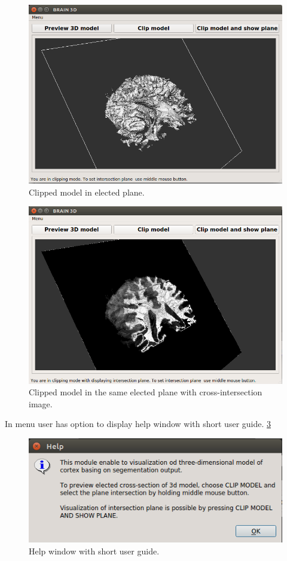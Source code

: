 \begin{figure}[H]
\centering{}\includegraphics[scale=0.7]{figures/Module_11/11_test_7.png}\caption{Clipped model in elected plane. \label{fig:figures/11_test_7}}
\end{figure}
\begin{figure}[H]
\centering{}\includegraphics[scale=0.7]{figures/Module_11/11_test_8.png}\caption{Clipped model in the same elected plane with cross-intersection image. \label{fig:figures/11_test_8}}
\end{figure}
\indent In menu user has option to display help window with short user guide. \ref{fig:figures/11_help}
\begin{figure}[H]
\centering{}\includegraphics[scale=0.7]{figures/Module_11/11_help.png}\caption{Help window with short user guide. \label{fig:figures/11_help}}
\end{figure}
